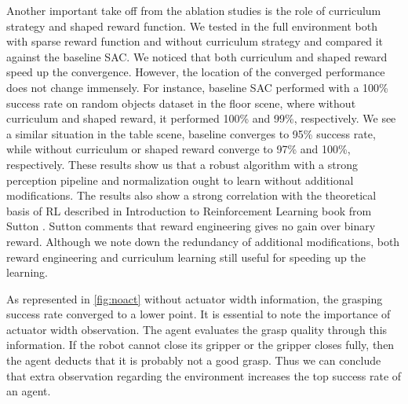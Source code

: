 Another important take off from the ablation studies is the role of curriculum strategy and shaped reward function. We tested in the full environment both with sparse reward function and without curriculum strategy and compared it against the baseline SAC. We noticed that both curriculum and shaped reward speed up the convergence. However, the location of the converged performance does not change immensely. For instance, baseline SAC performed with a 100\% success rate on random objects dataset in the floor scene, where without curriculum and shaped reward, it performed 100\% and 99\%, respectively. We see a similar situation in the table scene, baseline converges to 95\% success rate, while without curriculum or shaped reward converge to 97\% and 100\%, respectively. These results show us that a robust algorithm with a strong perception pipeline and normalization ought to learn without additional modifications. The results also show a strong correlation with the theoretical basis of RL described in Introduction to Reinforcement Learning book from Sutton \cite{Sutton2018}. Sutton comments that reward engineering gives no gain over binary reward. Although we note down the redundancy of additional modifications, both reward engineering and curriculum learning still useful for speeding up the learning.

As represented in \ref{fig:noact} without actuator width information, the grasping success rate converged to a lower point. It is essential to note the importance of actuator width observation. The agent evaluates the grasp quality through this information. If the robot cannot close its gripper or the gripper closes fully, then the agent deducts that it is probably not a good grasp. Thus we can conclude that extra observation regarding the environment increases the top success rate of an agent.





